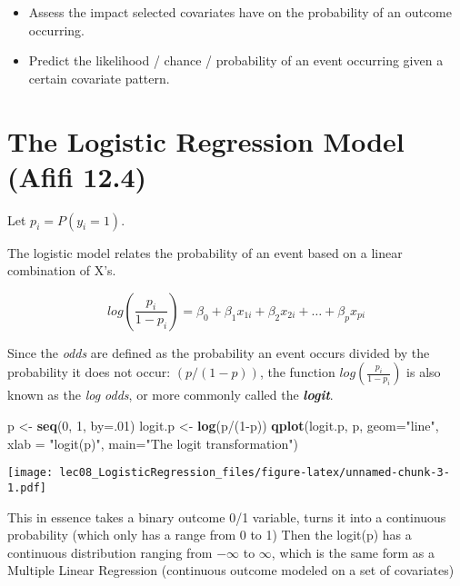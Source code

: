 \documentclass[]{article}
\newenvironment{Shaded}{\begin{snugshade}}{\end{snugshade}}
\newcommand{\KeywordTok}[1]{\textcolor[rgb]{0.13,0.29,0.53}{\textbf{{#1}}}}
\newcommand{\DataTypeTok}[1]{\textcolor[rgb]{0.13,0.29,0.53}{{#1}}}
\newcommand{\DecValTok}[1]{\textcolor[rgb]{0.00,0.00,0.81}{{#1}}}
\newcommand{\StringTok}[1]{\textcolor[rgb]{0.31,0.60,0.02}{{#1}}}
\newcommand{\NormalTok}[1]{{#1}}
\begin{document}
\begin{itemize}
\itemsep1pt\parskip0pt
\item
  Assess the impact selected covariates have on the probability of an
  outcome occurring.
\item
  Predict the likelihood / chance / probability of an event occurring
  given a certain covariate pattern.
\end{itemize}

\section{The Logistic Regression Model (Afifi
12.4)}\label{the-logistic-regression-model-afifi-12.4}

Let \(p_{i} = P(y_{i}=1)\).

The logistic model relates the probability of an event based on a linear
combination of X's.

\[
log\left(
\frac{p_{i}}{1-p_{i}}
\right) = \beta_{0} + \beta_{1}x_{1i} + \beta_{2}x_{2i} + \ldots + \beta_{p}x_{pi}
\]

Since the \emph{odds} are defined as the probability an event occurs
divided by the probability it does not occur: \((p/(1-p))\), the
function \(log\left(\frac{p_{i}}{1-p_{i}}\right)\) is also known as the
\emph{log odds}, or more commonly called the \textbf{\emph{logit}}.

\begin{Shaded}
\begin{Highlighting}[]
\NormalTok{p <-}\StringTok{ }\KeywordTok{seq}\NormalTok{(}\DecValTok{0}\NormalTok{, }\DecValTok{1}\NormalTok{, }\DataTypeTok{by=}\NormalTok{.}\DecValTok{01}\NormalTok{)}
\NormalTok{logit.p <-}\StringTok{ }\KeywordTok{log}\NormalTok{(p/(}\DecValTok{1}\NormalTok{-p))}
\KeywordTok{qplot}\NormalTok{(logit.p, p, }\DataTypeTok{geom=}\StringTok{"line"}\NormalTok{, }\DataTypeTok{xlab =} \StringTok{"logit(p)"}\NormalTok{, }\DataTypeTok{main=}\StringTok{"The logit transformation"}\NormalTok{)}
\end{Highlighting}
\end{Shaded}

\texttt{[image: lec08\_LogisticRegression\_files/figure-latex/unnamed-chunk-3-1.pdf]}

This in essence takes a binary outcome 0/1 variable, turns it into a
continuous probability (which only has a range from 0 to 1) Then the
logit(p) has a continuous distribution ranging from \(-\infty\) to
\(\infty\), which is the same form as a Multiple Linear Regression
(continuous outcome modeled on a set of covariates)
\end{document}
